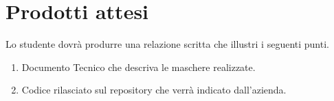 \section*{Prodotti attesi}
Lo studente dovrà produrre una relazione scritta che illustri i seguenti punti.
\begin{enumerate}
    \item Documento Tecnico che descriva le maschere realizzate.
    \item Codice rilasciato sul repository che verrà indicato dall'azienda.
\end{enumerate}
